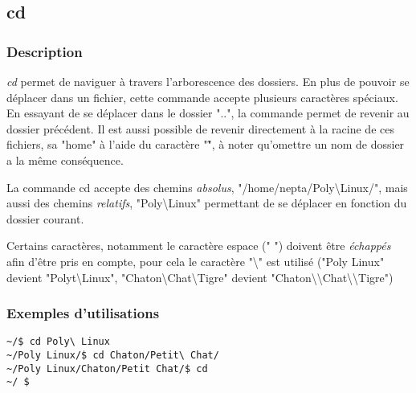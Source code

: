 \subsection{cd}
\subsubsection{Description}
\emph{cd} permet de naviguer à travers l'arborescence des dossiers.
En plus de pouvoir se déplacer dans un fichier, cette commande accepte plusieurs caractères spéciaux.
En essayant de se déplacer dans le dossier "..", la commande permet de revenir au dossier précédent.
Il est aussi possible de revenir directement à la racine de ces fichiers, sa "home" à l'aide du caractère "\~", à noter qu'omettre un nom de dossier a la même conséquence.

La commande cd accepte des chemins \emph{absolus}, "/home/nepta/Poly\textbackslash Linux/", mais aussi des chemins \emph{relatifs}, "Poly\textbackslash \textvisiblespace Linux" permettant de se déplacer en fonction du dossier courant.

Certains caractères, notamment le caractère espace (" ") doivent être \emph{échappés} afin d'être pris en compte, pour cela le caractère "\textbackslash" est utilisé ("Poly Linux" devient "Polyt\textbackslash Linux",
"Chaton\textbackslash Chat\textbackslash Tigre" devient "Chaton\textbackslash \textbackslash Chat\textbackslash \textbackslash Tigre")

\subsubsection{Exemples d'utilisations}

\begin{lstlisting}
~/$ cd Poly\ Linux
~/Poly Linux/$ cd Chaton/Petit\ Chat/
~/Poly Linux/Chaton/Petit Chat/$ cd
~/ $ 
\end{lstlisting}
